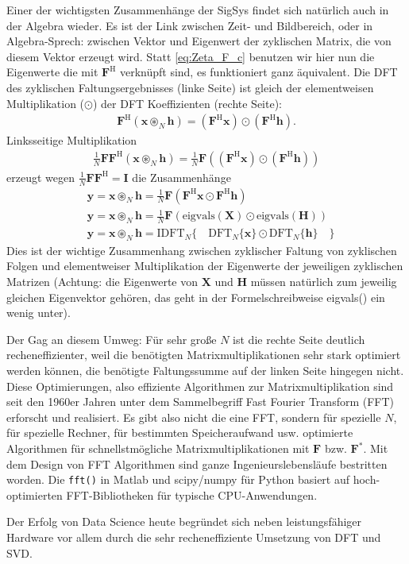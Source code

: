Einer der wichtigsten Zusammenhänge der SigSys findet sich natürlich auch
in der Algebra wieder. Es ist der Link zwischen Zeit- und Bildbereich, oder
in Algebra-Sprech: zwischen Vektor und Eigenwert der zyklischen Matrix, die von diesem
Vektor erzeugt wird. Statt \eqref{eq:Zeta_F_c} benutzen wir hier nun die Eigenwerte
die mit $\bm{F}^\mathrm{H}$ verknüpft sind, es funktioniert ganz äquivalent.
%
Die DFT des zyklischen Faltungsergebnisses (linke Seite)
ist gleich der elementweisen Multiplikation ($\odot$) der DFT Koeffizienten (rechte Seite):
\begin{align}
\bm{F}^\mathrm{H}(\bm{x} \circledast_N \bm{h}) = (\bm{F}^\mathrm{H}\bm{x})  \odot (\bm{F}^\mathrm{H}\bm{h}).
\end{align}
Linksseitige Multiplikation
\begin{align}
\frac{1}{N} \bm{F}\bm{F}^\mathrm{H}(\bm{x} \circledast_N \bm{h}) =
\frac{1}{N} \bm{F}\left( (\bm{F}^\mathrm{H}\bm{x})  \odot (\bm{F}^\mathrm{H}\bm{h}) \right)
\end{align}
erzeugt wegen $\frac{1}{N} \bm{F}\bm{F}^\mathrm{H} = \bm{I}$ die Zusammenhänge
\begin{align}
&\bm{y} = \bm{x} \circledast_N \bm{h} =
\frac{1}{N} \bm{F} \left( \bm{F}^\mathrm{H}\bm{x}  \odot \bm{F}^\mathrm{H}\bm{h} \right)\\
&\bm{y} = \bm{x} \circledast_N \bm{h} =
\frac{1}{N} \bm{F}\left( \mathrm{eigvals}(\bm{X})  \odot \mathrm{eigvals}(\bm{H}) \right)\\
&\bm{y} = \bm{x} \circledast_N \bm{h} = \mathrm{IDFT}_N\{\quad  \mathrm{DFT}_N\{\bm{x}\} \odot  \mathrm{DFT}_N\{\bm{h}\} \quad \}
\end{align}
Dies ist der wichtige Zusammenhang zwischen zyklischer Faltung von zyklischen Folgen und
elementweiser Multiplikation der Eigenwerte der jeweiligen zyklischen Matrizen
(Achtung: die Eigenwerte von $\bm{X}$ und $\bm{H}$ müssen natürlich zum jeweilig gleichen
Eigenvektor gehören, das geht in der Formelschreibweise eigvals() ein wenig unter).
%

Der Gag an diesem Umweg:
Für sehr große $N$ ist die rechte Seite deutlich recheneffizienter, weil
die benötigten Matrixmultiplikationen sehr stark optimiert werden können, die benötigte
Faltungssumme auf der linken Seite hingegen nicht.
%
Diese Optimierungen, also effiziente Algorithmen zur Matrixmultiplikation
sind seit den 1960er Jahren unter dem Sammelbegriff Fast Fourier Transform
(FFT) erforscht und realisiert.
Es gibt also nicht die eine FFT, sondern für spezielle $N$, für
spezielle Rechner, für bestimmten Speicheraufwand usw.
optimierte Algorithmen für schnellstmögliche Matrixmultiplikationen mit
$\bm{F}$ bzw. $\bm{F}^\mathrm{*}$. Mit dem Design von FFT Algorithmen sind ganze
Ingenieurslebensläufe bestritten worden. Die \texttt{fft()} in Matlab und
scipy/numpy für Python basiert auf hoch-optimierten FFT-Bibliotheken für
typische CPU-Anwendungen.

Der Erfolg von Data Science heute begründet sich neben leistungsfähiger Hardware
vor allem durch die sehr recheneffiziente Umsetzung von DFT und SVD.
